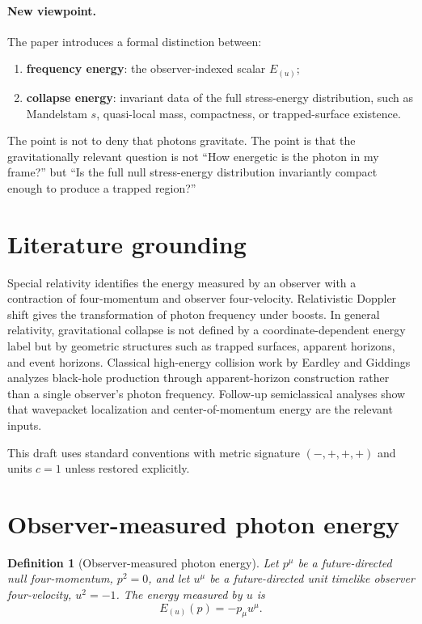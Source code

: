 \documentclass[11pt]{article}
\newtheorem{definition}{Definition}
\theoremstyle{remark}
\begin{document}
\paragraph{New viewpoint.} The paper introduces a formal distinction between:
\begin{enumerate}[label=(\roman*)]
\item \textbf{frequency energy}: the observer-indexed scalar $E_{(u)}$;
\item \textbf{collapse energy}: invariant data of the full stress-energy distribution, such as Mandelstam $s$, quasi-local mass, compactness, or trapped-surface existence.
\end{enumerate}
The point is not to deny that photons gravitate. The point is that the gravitationally relevant question is not ``How energetic is the photon in my frame?'' but ``Is the full null stress-energy distribution invariantly compact enough to produce a trapped region?''

\section{Literature grounding}

Special relativity identifies the energy measured by an observer with a contraction of four-momentum and observer four-velocity. Relativistic Doppler shift gives the transformation of photon frequency under boosts. In general relativity, gravitational collapse is not defined by a coordinate-dependent energy label but by geometric structures such as trapped surfaces, apparent horizons, and event horizons. Classical high-energy collision work by Eardley and Giddings analyzes black-hole production through apparent-horizon construction rather than a single observer's photon frequency. Follow-up semiclassical analyses show that wavepacket localization and center-of-momentum energy are the relevant inputs.

This draft uses standard conventions with metric signature $(-,+,+,+)$ and units $c=1$ unless restored explicitly.

\section{Observer-measured photon energy}

\begin{definition}[Observer-measured photon energy]
Let $p^\mu$ be a future-directed null four-momentum, $p^2=0$, and let $u^\mu$ be a future-directed unit timelike observer four-velocity, $u^2=-1$. The energy measured by $u$ is
\begin{equation}
E_{(u)}(p) = - p_\mu u^\mu .
\end{equation}
\end{definition}
\end{document}
